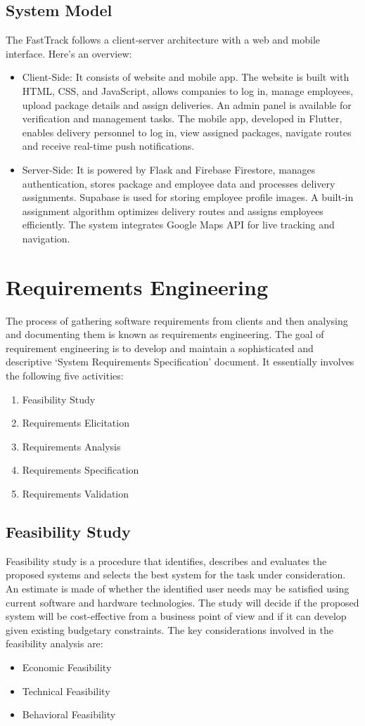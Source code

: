 \subsection{System Model}
The FastTrack follows a client-server architecture with a web and mobile interface. Here’s an overview:
\begin{itemize}
    \item Client-Side: It consists of website and mobile app. The website is built with HTML, CSS, and JavaScript, allows companies to log in, manage employees, upload package details and assign deliveries. An admin panel is available for verification and management tasks. The mobile app, developed in Flutter, enables delivery personnel to log in, view assigned packages, navigate routes and receive real-time push notifications.
    \item Server-Side: It is powered by Flask and Firebase Firestore, manages authentication, stores package and employee data and processes delivery assignments. Supabase is used for storing employee profile images. A built-in assignment algorithm optimizes delivery routes and assigns employees efficiently. The system integrates Google Maps API for live tracking and navigation.
\end{itemize}
\section{Requirements Engineering}
The process of gathering software requirements from clients and then analysing and documenting them is known as requirements engineering. The goal of requirement engineering is to develop and maintain a sophisticated and descriptive ‘System Requirements Specification’ document. It essentially involves the following five activities:
\begin{enumerate}
    \item Feasibility Study
    \item Requirements Elicitation
    \item Requirements Analysis
    \item Requirements Specification
    \item Requirements Validation
\end{enumerate}
\subsection{Feasibility Study}
Feasibility study is a procedure that identifies, describes and evaluates the proposed
systems and selects the best system for the task under consideration. An estimate is made
of whether the identified user needs may be satisfied using current software and hardware
technologies. The study will decide if the proposed system will be cost-effective from a
business point of view and if it can develop given existing budgetary constraints. The key
considerations involved in the feasibility analysis are: 
\begin{itemize}
    \item Economic Feasibility
    \item Technical Feasibility
    \item Behavioral Feasibility
\end{itemize}
